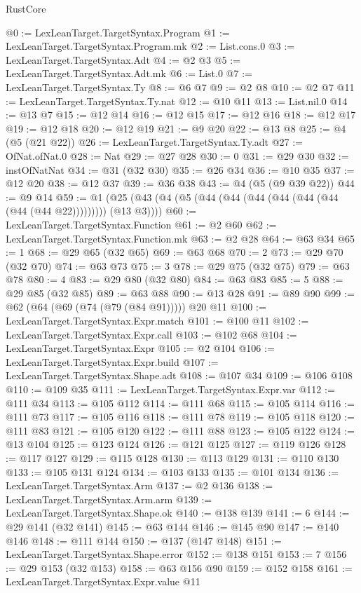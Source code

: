\begin{lexlean}{RustCore}
\begin{coremodule}
{\begin{coremodule}
{{{{{{{{{{{{{{{{{{{{{{{{{{{{{{{{{{{{{{{{{{{{{{{@0 := LexLeanTarget.TargetSyntax.Program
@1 := LexLeanTarget.TargetSyntax.Program.mk
@2 := List.cons.{0}
@3 := LexLeanTarget.TargetSyntax.Adt
@4 := @2 @3
@5 := LexLeanTarget.TargetSyntax.Adt.mk
@6 := List.{0}
@7 := LexLeanTarget.TargetSyntax.Ty
@8 := @6 @7
@9 := @2 @8
@10 := @2 @7
@11 := LexLeanTarget.TargetSyntax.Ty.nat
@12 := @10 @11
@13 := List.nil.{0}
@14 := @13 @7
@15 := @12 @14
@16 := @12 @15
@17 := @12 @16
@18 := @12 @17
@19 := @12 @18
@20 := @12 @19
@21 := @9 @20
@22 := @13 @8
@25 := @4 (@5 (@21 @22))
@26 := LexLeanTarget.TargetSyntax.Ty.adt
@27 := OfNat.ofNat.{0}
@28 := Nat
@29 := @27 @28
@30 := 0
@31 := @29 @30
@32 := instOfNatNat
@34 := @31 (@32 @30)
@35 := @26 @34
@36 := @10 @35
@37 := @12 @20
@38 := @12 @37
@39 := @36 @38
@43 := @4 (@5 (@9 @39 @22))
@44 := @9 @14
@59 := @1 (@25 (@43 (@4 (@5 (@44 (@44 (@44 (@44 (@44 (@44 (@44 (@44 @22))))))))) (@13 @3))))
@60 := LexLeanTarget.TargetSyntax.Function
@61 := @2 @60
@62 := LexLeanTarget.TargetSyntax.Function.mk
@63 := @2 @28
@64 := @63 @34
@65 := 1
@68 := @29 @65 (@32 @65)
@69 := @63 @68
@70 := 2
@73 := @29 @70 (@32 @70)
@74 := @63 @73
@75 := 3
@78 := @29 @75 (@32 @75)
@79 := @63 @78
@80 := 4
@83 := @29 @80 (@32 @80)
@84 := @63 @83
@85 := 5
@88 := @29 @85 (@32 @85)
@89 := @63 @88
@90 := @13 @28
@91 := @89 @90
@99 := @62 (@64 (@69 (@74 (@79 (@84 @91))))) @20 @11
@100 := LexLeanTarget.TargetSyntax.Expr.match
@101 := @100 @11
@102 := LexLeanTarget.TargetSyntax.Expr.call
@103 := @102 @68
@104 := LexLeanTarget.TargetSyntax.Expr
@105 := @2 @104
@106 := LexLeanTarget.TargetSyntax.Expr.build
@107 := LexLeanTarget.TargetSyntax.Shape.adt
@108 := @107 @34
@109 := @106 @108
@110 := @109 @35
@111 := LexLeanTarget.TargetSyntax.Expr.var
@112 := @111 @34
@113 := @105 @112
@114 := @111 @68
@115 := @105 @114
@116 := @111 @73
@117 := @105 @116
@118 := @111 @78
@119 := @105 @118
@120 := @111 @83
@121 := @105 @120
@122 := @111 @88
@123 := @105 @122
@124 := @13 @104
@125 := @123 @124
@126 := @121 @125
@127 := @119 @126
@128 := @117 @127
@129 := @115 @128
@130 := @113 @129
@131 := @110 @130
@133 := @105 @131 @124
@134 := @103 @133
@135 := @101 @134
@136 := LexLeanTarget.TargetSyntax.Arm
@137 := @2 @136
@138 := LexLeanTarget.TargetSyntax.Arm.arm
@139 := LexLeanTarget.TargetSyntax.Shape.ok
@140 := @138 @139
@141 := 6
@144 := @29 @141 (@32 @141)
@145 := @63 @144
@146 := @145 @90
@147 := @140 @146
@148 := @111 @144
@150 := @137 (@147 @148)
@151 := LexLeanTarget.TargetSyntax.Shape.error
@152 := @138 @151
@153 := 7
@156 := @29 @153 (@32 @153)
@158 := @63 @156 @90
@159 := @152 @158
@161 := LexLeanTarget.TargetSyntax.Expr.value @11
}}}}}}}}}}}}}}}}}}}}}}}}}}}}}}}}}}}}}}}}}}}}}}}
\end{coremodule}}
\end{coremodule}
\end{lexlean}
